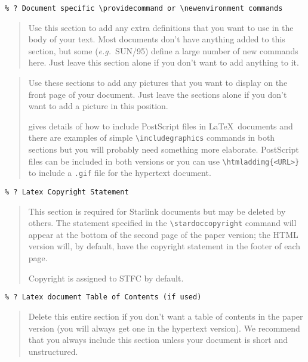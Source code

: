\documentclass[twoside,11pt,nolof]{starlink}
\begin{document}
\verb+% ? Document specific \providecommand or \newenvironment commands+

\begin{quote}
Use this section to add any extra definitions that you want to use in the body
of your text.
Most documents don't have anything added to this section, but some
({\em{e.g.}}\ SUN/95) define a large number of new commands here.
Just leave this section alone if you don't want to add anything to it.
\end{quote}
\begin{terminalv}
\end{terminalv}
\begin{quote}
Use these sections to add any pictures that you want to display on the front
page of your document.
Just leave the sections alone if you don't want to add a picture in this
position.

gives details of how to include PostScript files in \LaTeX\ documents
and there are examples of simple \verb+\includegraphics+ commands in both
sections but you will probably need something more elaborate.
PostScript files can be included in both versions
or you can use \verb+\htmladdimg{<URL>}+ to include a \texttt{.gif} file for
the hypertext document.
\end{quote}

\verb+% ? Latex Copyright Statement+

\begin{quote}
This section is required for Starlink documents but may be deleted by others.
The statement specified in the \verb+\stardoccopyright+ command will appear at
the bottom of the second page of the paper version; the HTML version will, by
default, have the copyright statement in the footer of each page.

Copyright is assigned to STFC by default.
\end{quote}

\verb+% ? Latex document Table of Contents (if used)+

\begin{quote}
Delete this entire section if you don't want a table of contents in the paper
version (you will always get one in the hypertext version).
We recommend that you always include this section unless your document is short
and unstructured.
\end{quote}
\end{document}
